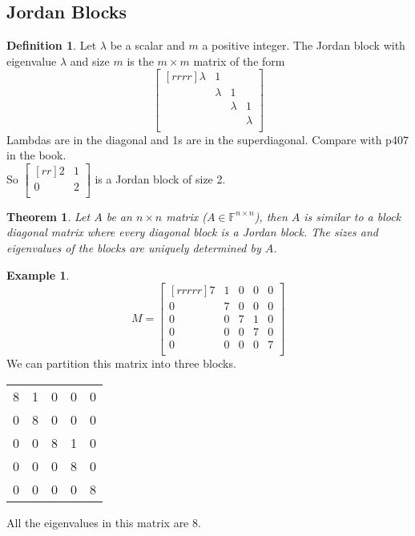\documentclass{report}
\theoremstyle{plain}
\newtheorem*{thrm}{Theorem}
\theoremstyle{definition}
\newtheorem*{ex}{Example}
\newtheorem*{defn}{Definition}
\theoremstyle{plain}
\begin{document}
\subsection{Jordan Blocks}
\begin{defn}
Let $\lambda$ be a scalar and $m$ a positive integer. The Jordan block with eigenvalue $\lambda$ and size $m$ is the $m\times m$ matrix of the form
\[ \begin{bmatrix}[rrrr]\lambda&1&{}&{}\\{}&\lambda&1&{}\\{}&{}&\lambda&1\\{}&{}&{}&\lambda\\\end{bmatrix} \]
Lambdas are in the diagonal and 1s are in the superdiagonal. Compare with p407 in the book.\\
So $\begin{bmatrix}[rr]2&1\\0&2\\\end{bmatrix}$ is a Jordan block of size 2.
\end{defn}
\begin{thrm}
Let $A$ be an $n\times n$ matrix ($A\in \mathbb{F}^{n\times n}$), then $A$ is similar to a block diagonal matrix where every diagonal block is a Jordan block. The sizes and eigenvalues of the blocks are uniquely determined by $A$.
\end{thrm}
\begin{ex}
\[ M=\begin{bmatrix}[rrrrr]7&1&0&0&0\\0&7&0&0&0\\0&0&7&1&0\\0&0&0&7&0\\0&0&0&0&7\\\end{bmatrix} \]
We can partition this matrix into three blocks.
\begin{tabular}{cc|cc|c}
8&1&0&0&0\\
0&8&0&0&0\\
\hline
0&0&8&1&0\\
0&0&0&8&0\\
\hline
0&0&0&0&8\\
\end{tabular}
All the eigenvalues in this matrix are 8.
\end{ex}
\end{document}
